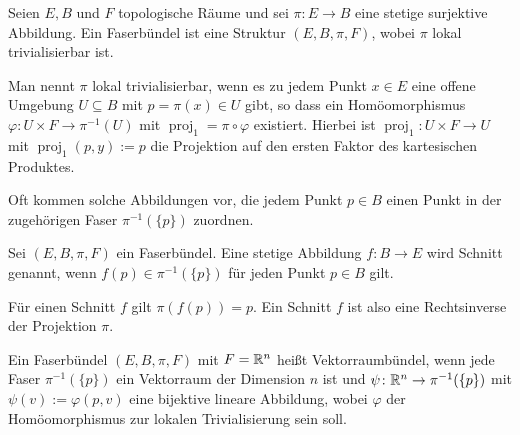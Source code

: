 \begin{definition}[Faserbündel]
Seien $E,B$ und $F$ topologische Räume und sei $\pi\colon E\to B$
eine stetige surjektive Abbildung. Ein Faserbündel ist eine Struktur
$(E,B,\pi,F)$, wobei $\pi$ lokal trivialisierbar ist.

Man nennt $\pi$ lokal trivialisierbar, wenn es zu jedem Punkt
$x\in E$ eine offene Umgebung $U\subseteq B$ mit $p=\pi(x)\in U$
gibt, so dass ein Homöomorphismus $\varphi\colon U\times F\to\pi^{-1}(U)$
mit $\operatorname{proj}_1 = \pi\circ\varphi$ existiert. Hierbei
ist $\operatorname{proj}_1\colon U\times F\to U$ mit
$\operatorname{proj}_1(p,y):=p$ die Projektion auf den ersten Faktor
des kartesischen Produktes.
\end{definition}

\noindent
Oft kommen solche Abbildungen vor, die jedem Punkt $p\in B$ einen Punkt
in der zugehörigen Faser $\pi^{-1}(\{p\})$ zuordnen.

\begin{definition}[Schnitt]
Sei $(E,B,\pi,F)$ ein Faserbündel. Eine stetige Abbildung
$f\colon B\to E$ wird Schnitt genannt, wenn $f(p)\in\pi^{-1}(\{p\})$
für jeden Punkt $p\in B$ gilt.
\end{definition}

\noindent
Für einen Schnitt $f$ gilt $\pi(f(p))=p$. Ein Schnitt $f$ ist also eine
Rechtsinverse der Projektion $\pi$.

\begin{definition}[Vektorraumbündel]
Ein Faserbündel $(E,B,\pi,F)$ mit $F=\mathbb R^n$ heißt Vektorraumbündel, wenn
jede Faser $\pi^{-1}(\{p\})$ ein Vektorraum der Dimension $n$ ist und
$\psi\colon\mathbb R^n\to\pi^{-1}(\{p\})$ mit $\psi(v):=\varphi(p,v)$
eine bijektive lineare Abbildung, wobei $\varphi$ der Homöomorphismus
zur lokalen Trivialisierung sein soll.
\end{definition}




